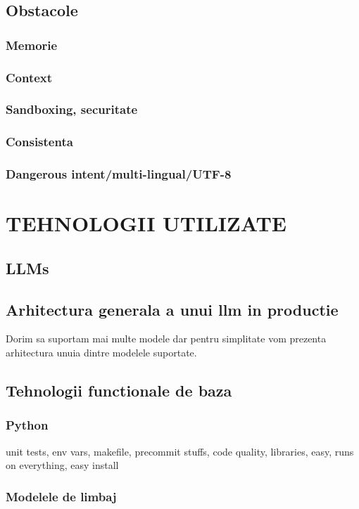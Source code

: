 \documentclass[12pt, a4paper, oneside, romanian, draft]{teza-upb}
\begin{document}
  \section{Obstacole}
    \subsection{Memorie}
    \subsection{Context}
    \subsection{Sandboxing, securitate}
    \subsection{Consistenta}
    \subsection{Dangerous intent/multi-lingual/UTF-8}

\chapter{TEHNOLOGII UTILIZATE}


  \section{LLMs}


  \section{Arhitectura generala a unui \ac{llm} in productie}
  Dorim sa suportam mai multe modele dar pentru simplitate vom prezenta arhitectura unuia dintre modelele suportate.


  \section{Tehnologii functionale de baza}
    \subsection{Python}
    unit tests, env vars, makefile, precommit stuffs, code quality, libraries, easy, runs on everything, easy install
    \subsection{Modelele de limbaj}
\end{document}
